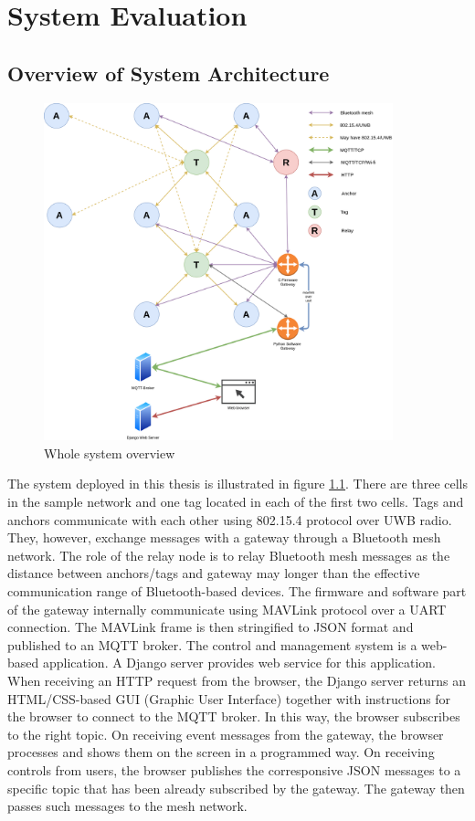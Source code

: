 \documentclass[\main/main.tex]{subfiles}
\begin{document}
\graphicspath{{img/}{06_result/img/}}

\chapter{System Evaluation}

\section{Overview of System Architecture}
\begin{figure}[H]
    \centering
    \includegraphics[width=0.9\textwidth]{system_overview.png}
    \caption{Whole system overview}
    \label{fig:system_overview}
\end{figure}
The system deployed in this thesis is illustrated in figure \ref{fig:system_overview}. There are three cells in the sample network and one tag located in each of the first two cells. Tags and anchors communicate with each other using 802.15.4 protocol over UWB radio. They, however, exchange messages with a gateway through a Bluetooth mesh network. The role of the relay node is to relay Bluetooth mesh messages as the distance between anchors/tags and gateway may longer than the effective communication range of Bluetooth-based devices. The firmware and software part of the gateway internally communicate using MAVLink protocol over a UART connection. The MAVLink frame is then stringified to JSON format and published to an MQTT broker. The control and management system is a web-based application. A Django server provides web service for this application. When receiving an HTTP request from the browser, the Django server returns an HTML/CSS-based GUI (Graphic User Interface) together with instructions for the browser to connect to the MQTT broker. In this way, the browser subscribes to the right topic. On receiving event messages from the gateway, the browser processes and shows them on the screen in a programmed way. On receiving controls from users, the browser publishes the corresponsive JSON messages to a specific topic that has been already subscribed by the gateway. The gateway then passes such messages to the mesh network.
\end{document}
